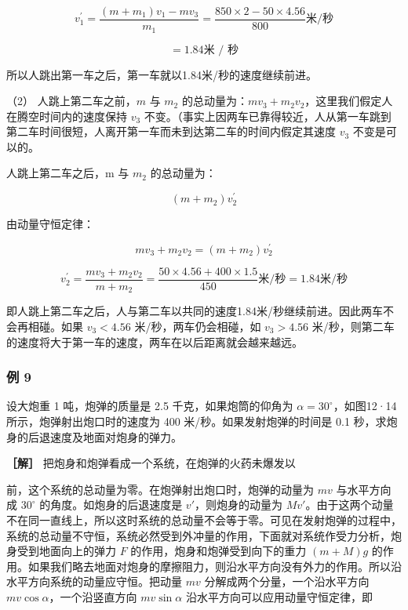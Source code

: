 \[
v _ {1} ^ {\prime} = \frac {(m + m _ {1}) v _ {1} - m v _ {3}}{m _ {1}} = \frac {850 \times 2 - 50 \times 4.56}{800} \text{米/秒}
\]

\[
= 1.84 \text{米 / 秒}
\]

所以人跳出第一车之后，第一车就以1.84米/秒的速度继续前进。

（2） 人跳上第二车之前，\(m\) 与 \(m_{2}\)
的总动量为：\(mv_{3} + m_{2}v_{2}\)，这里我们假定人在腾空时间内的速度保持
\(v_{3}\)
不变。（事实上因两车已靠得较近，人从第一车跳到第二车时间很短，人离开第一车而未到达第二车的时间内假定其速度
\(v_{3}\) 不变是可以的。

人跳上第二车之后，m 与 \(m_{2}\) 的总动量为：

\[
(m + m _ {2}) v _ {2} ^ {\prime}
\]

由动量守恒定律：

\[
mv_{3}+m_{2}v_{2}=(m+m_{2})v_{2}^{\prime}
\]

\[
v_{2}^{\prime} =\frac{mv_{3}+m_{2}v_{2}}{m+m_{2}} =\frac{50\times4.56+400\times1.5}{450}\text{米/秒} =1.84\text{米/秒}
\]

即人跳上第二车之后，人与第二车以共同的速度1.84米/秒继续前进。因此两车不会再相碰。如果
\(v_{3}<4.56\) 米/秒，两车仍会相碰，如 \(v_{3}>4.56\)
米/秒，则第二车的速度将大于第一车的速度，两车在以后距离就会越来越远。

\subsubsection{例 9}\label{ux4f8b-9-6}

设大炮重 1 吨，炮弹的质量是 2.5 千克，如果炮筒的仰角为
\(\alpha = 30^{\circ}\)，如图12·14 所示，炮弹射出炮口时的速度为 400
米/秒。如果发射炮弹的时间是 0.1 秒，求炮身的后退速度及地面对炮身的弹力。

\textbf{［解］} 把炮身和炮弹看成一个系统，在炮弹的火药未爆发以

前，这个系统的总动量为零。在炮弹射出炮口时，炮弹的动量为 \(mv\)
与水平方向成 \(30^{\circ}\) 的角度。如炮身的后退速度是
\(v'\)，则炮身的动量为
\(Mv'\)。由于这两个动量不在同一直线上，所以这时系统的总动量不会等于零。可见在发射炮弹的过程中，系统的总动量不守恒，系统必然受到外冲量的作用，下面就对系统作受力分析，炮身受到地面向上的弹力
\(F\) 的作用，炮身和炮弹受到向下的重力 \((m + M)g\)
的作用。如果我们略去地面对炮身的摩擦阻力，则沿水平方向没有外力的作用。所以沿水平方向系统的动量应守恒。把动量
\(mv\) 分解成两个分量，一个沿水平方向 \(mv\cos \alpha\)，一个沿竖直方向
\(mv\sin \alpha\) 沿水平方向可以应用动量守恒定律，即

